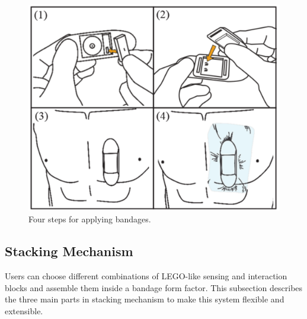 \begin{figure}[!ht]
\centering
\includegraphics[width=15cm]{image/bio_fig2}
\caption{Four steps for applying bandages.}
\label{bio_steps}
\end{figure}

\subsection{Stacking Mechanism}
Users can choose different combinations of LEGO-like sensing and interaction blocks and assemble them inside a bandage form factor. This subsection describes the three main parts in stacking mechanism to make this system flexible and extensible.

